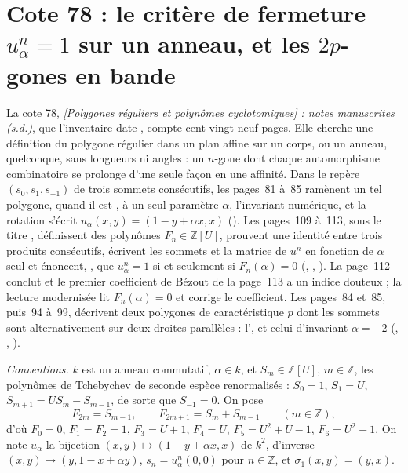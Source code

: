 \section[Cote 78 : le critère de fermeture des polygones réguliers sur un anneau, et les 2p-gones en bande]{Cote 78 : le critère de fermeture $u_\alpha^n = 1$ sur un anneau, et les $2p$-gones en bande\protect{}}\label{sec:78}

La cote 78, \emph{[Polygones réguliers et polynômes cyclotomiques] : notes manuscrites (s.d.)}, que l'inventaire date \q{[à partir de 1977]}, compte cent vingt-neuf pages. Elle cherche une définition du polygone régulier dans un plan affine sur un corps, ou un anneau, quelconque, sans longueurs ni angles : un $n$-gone dont chaque automorphisme combinatoire se prolonge d'une seule façon en une affinité. Dans le repère $(s_0, s_1, s_{-1})$ de trois sommets consécutifs, les pages~81 à~85 ramènent un tel polygone, quand il est , à un seul paramètre $\alpha$, l'invariant numérique, et la rotation s'écrit $u_\alpha(x, y) = (1 - y + \alpha x, x)$ (). Les pages~109 à~113, sous le titre , définissent des polynômes $F_n \in \mathbb Z[U]$, prouvent une identité entre trois produits consécutifs, écrivent les sommets et la matrice de $u^n$ en fonction de $\alpha$ seul et énoncent, , que $u_\alpha^n = 1$ si et seulement si $F_n(\alpha) = 0$ (, , ). La page~112 conclut  et le premier coefficient de Bézout de la page~113 a un indice douteux ; la lecture modernisée lit $F_n(\alpha) = 0$ et corrige le coefficient. Les pages~84 et~85, puis~94 à~99, décrivent deux polygones de caractéristique $p$ dont les sommets sont alternativement sur deux droites parallèles : l', et celui d'invariant $\alpha = -2$ (, , ).

\noindent\emph{Conventions.} $k$ est un anneau commutatif, $\alpha \in k$, et $S_m \in \mathbb Z[U]$, $m \in \mathbb Z$, les polynômes de Tchebychev de seconde espèce renormalisés : $S_0 = 1$, $S_1 = U$, $S_{m+1} = U S_m - S_{m-1}$, de sorte que $S_{-1} = 0$. On pose
\[ F_{2m} = S_{m-1}, \qquad F_{2m+1} = S_m + S_{m-1} \qquad (m \in \mathbb Z), \]
d'où $F_0 = 0$, $F_1 = F_2 = 1$, $F_3 = U + 1$, $F_4 = U$, $F_5 = U^2 + U - 1$, $F_6 = U^2 - 1$. On note $u_\alpha$ la bijection $(x, y) \mapsto (1 - y + \alpha x, x)$ de $k^2$, d'inverse $(x, y) \mapsto (y, 1 - x + \alpha y)$, $s_n = u_\alpha^n(0, 0)$ pour $n \in \mathbb Z$, et $\sigma_1(x, y) = (y, x)$.

